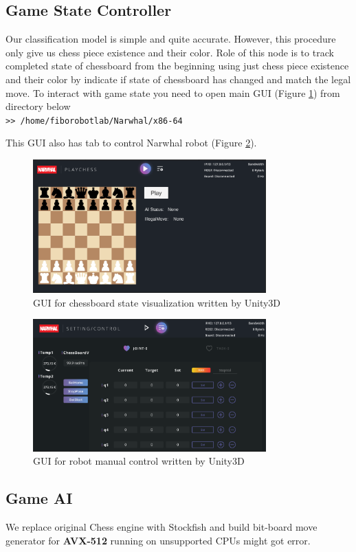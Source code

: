 \documentclass[11pt,fleqn]{book} %
\begin{document}
\subsection{Game State Controller}
Our classification model is simple and quite accurate. However, this procedure only give us chess piece existence and their color. Role of this node is to track completed state of chessboard from the beginning using just chess piece existence and their color by indicate if state of chessboard has changed and match the legal move.
To interact with game state you need to open main GUI (Figure \ref{fig:GUI_chess}) from directory below \\
\texttt{>> /home/fiborobotlab/Narwhal/x86-64}\\

\raggedright
This GUI also has tab to control Narwhal robot (Figure \ref{fig:GUI_robot}).

\begin{figure}
\centering
\includegraphics[width=0.8\textwidth]{GUI_chess}
\caption{\label{fig:GUI_chess}GUI for chessboard state visualization written by Unity3D}
\end{figure}
\begin{figure}
\centering
\includegraphics[width=0.8\textwidth]{GUI_robot}
\caption{\label{fig:GUI_robot}GUI for robot manual control written by Unity3D}
\end{figure}

\subsection{Game AI}
We replace original Chess engine with Stockfish and build bit-board move generator for \textbf{\color{blue}AVX-512} running on unsupported CPUs might got error.
\end{document}

